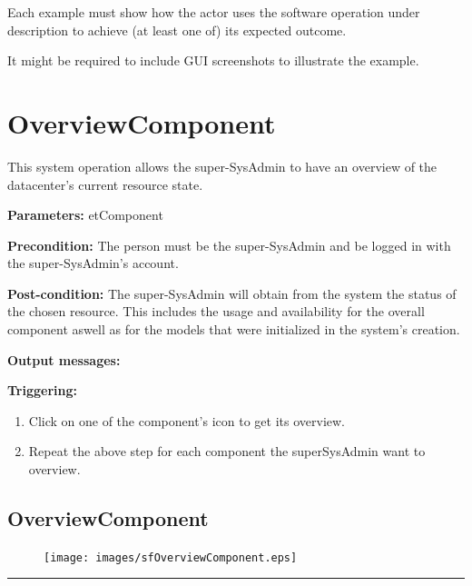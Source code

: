Each example must show how the actor uses the software operation under
description to achieve (at least one of) its expected outcome.

It might be required to include GUI screenshots to illustrate the example.




\section{OverviewComponent}
\label{operation:overviewcomponent}
This system operation allows the super-SysAdmin to have an overview of the
datacenter's current resource state.

\begin{description}

\item \textbf{Parameters:} etComponent
\item \textbf{Precondition:} The person must be the super-SysAdmin and be logged
in with the super-SysAdmin's account.
\item \textbf{Post-condition:} The super-SysAdmin will obtain from the system
the status of the chosen resource. This includes the usage and
availability for the overall component aswell as for the models that were
initialized in the system's creation.
\item \textbf{Output messages:}

\item \textbf{Triggering:}
\begin{enumerate}
\item Click on one of the component's icon to get its overview.
\item Repeat the above step for each component the superSysAdmin want to
overview.
\end{enumerate}

 
\end{description}

\subsection{OverviewComponent}



\begin{figure}[H]
\centering
\texttt{[image: images/sfOverviewComponent.eps]}
\caption{\label{overflow}}
\end{figure}


\hrule
\vspace{0.5cm}



